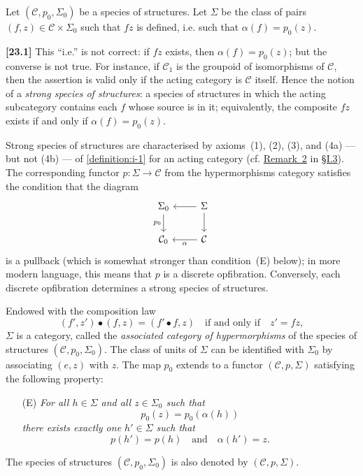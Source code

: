 \documentclass[a4paper,fleqn]{article}
\theoremstyle{plain}
\theoremstyle{definition}
\newenvironment{longcomm}[1]
  {\noindent\textbf{[#1]}\rmfamily}
  {}
\newcommand{\oldpage}[1]{{\marginpar{\footnotesize$\bigg\vert$\,\,\,\,\textit{p.~#1}}}}
\newcommand{\textand}{\quad\text{and}\quad}
\newcommand{\CC}{\mathcal{C}}
\begin{document}
Let $(\CC,p_0,\Sigma_0)$ be a species of structures.
Let $\Sigma$ be the class of pairs $(f,z)\in\CC\times\Sigma_0$ such that $fz$ is defined, i.e. such that $\alpha(f)=p_0(z)$.

\begin{longcomm}{23.1}
  This ``i.e.'' is not correct: if $fz$ exists, then $\alpha(f)=p_0(z)$;
  but the converse is not true.
  For instance, if $\CC_1$ is the groupoid of isomorphisms of $\CC$, then the assertion is valid only if the acting category is $\CC$ itself.
  Hence the notion of a \emph{strong species of structures}: a species of structures in which the acting subcategory contains each $f$ whose source is in it;
  equivalently, the composite $fz$ exists if and only if $\alpha(f)=p_0(z)$.

  Strong species of structures are characterised by axioms~(1), (2), (3), and (4a) --- but not (4b) --- of \cref{definition:i-1} for an acting category (cf. \hyperref[remark:i-2]{Remark~2} in \hyperref[section:i.3]{§I.3}).
  The corresponding functor $p\colon\Sigma\to\CC$ from the hypermorphisms category satisfies the condition that the diagram
  \[
    \begin{tikzcd}
      \Sigma_0
        \ar[d,swap,"p_0"]
      & \Sigma
        \ar[l]
        \ar[d]
    \\\CC_0
      & \CC
        \ar[l,"\alpha"]
    \end{tikzcd}
  \]
  is a pullback (which is somewhat stronger than condition~(E) below);
  in more modern language, this means that $p$ is a discrete opfibration.
  Conversely, each discrete opfibration determines a strong species of structures.
\end{longcomm}

Endowed with the composition law
\[
  (f',z')\bullet(f,z)
  = (f'\bullet f,z)
  \quad\text{if and only if}\quad
  z'=fz,
\]
\oldpage{352}
$\Sigma$ is a category, called the \emph{associated category of hypermorphisms} of the species of structures $(\CC,p_0,\Sigma_0)$.
The class of units of $\Sigma$ can be identified with $\Sigma_0$ by associating $(e,z)$ with $z$.
The map $p_0$ extends to a functor $(\CC,p,\Sigma)$ satisfying the following property:
\begin{enumerate}
  \item[\normalfont(E)] \itshape
    For all $h\in\Sigma$ and all $z\in\Sigma_0$ such that
    \[
      p_0(z)
      = p_0(\alpha(h))
    \]
    there exists exactly one $h'\in\Sigma$ such that
    \[
      p(h')=p(h)
      \textand
      \alpha(h')=z.
    \]
\end{enumerate}
The species of structures $(\CC,p_0,\Sigma_0)$ is also denoted by $(\CC,p,\Sigma)$.
\end{document}
